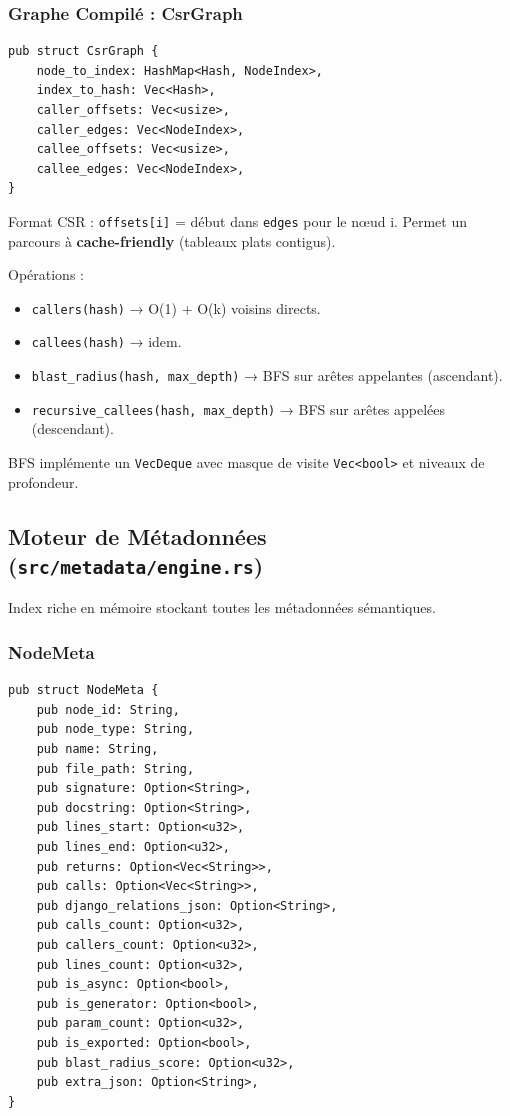 \documentclass[12pt,a4paper]{article}
\newcommand{\code}[1]{\texttt{#1}}
\begin{document}
\subsubsection{Graphe Compilé : CsrGraph}

\begin{verbatim}
pub struct CsrGraph {
    node_to_index: HashMap<Hash, NodeIndex>,
    index_to_hash: Vec<Hash>,
    caller_offsets: Vec<usize>,
    caller_edges: Vec<NodeIndex>,
    callee_offsets: Vec<usize>,
    callee_edges: Vec<NodeIndex>,
}
\end{verbatim}

Format CSR : \code{offsets[i]} = début dans \code{edges} pour le nœud i. Permet un parcours à \textbf{cache-friendly} (tableaux plats contigus).

Opérations :
\begin{itemize}
    \item \code{callers(hash)} → O(1) + O(k) voisins directs.
    \item \code{callees(hash)} → idem.
    \item \code{blast\_radius(hash, max\_depth)} → BFS sur arêtes appelantes (ascendant).
    \item \code{recursive\_callees(hash, max\_depth)} → BFS sur arêtes appelées (descendant).
\end{itemize}

BFS implémente un \code{VecDeque} avec masque de visite \code{Vec<bool>} et niveaux de profondeur.

\subsection{Moteur de Métadonnées (\code{src/metadata/engine.rs})}

Index riche en mémoire stockant toutes les métadonnées sémantiques.

\subsubsection{NodeMeta}

\begin{verbatim}
pub struct NodeMeta {
    pub node_id: String,
    pub node_type: String,
    pub name: String,
    pub file_path: String,
    pub signature: Option<String>,
    pub docstring: Option<String>,
    pub lines_start: Option<u32>,
    pub lines_end: Option<u32>,
    pub returns: Option<Vec<String>>,
    pub calls: Option<Vec<String>>,
    pub django_relations_json: Option<String>,
    pub calls_count: Option<u32>,
    pub callers_count: Option<u32>,
    pub lines_count: Option<u32>,
    pub is_async: Option<bool>,
    pub is_generator: Option<bool>,
    pub param_count: Option<u32>,
    pub is_exported: Option<bool>,
    pub blast_radius_score: Option<u32>,
    pub extra_json: Option<String>,
}
\end{verbatim}
\end{document}
